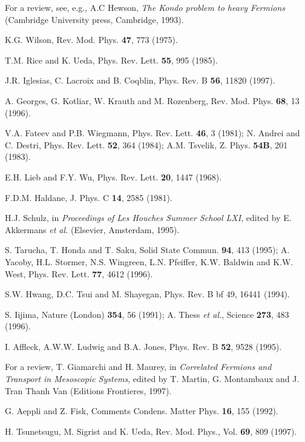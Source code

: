\begin{references}

For a review, see, e.g., A.C Hewson, {\it The Kondo problem to 
heavy Fermions} (Cambridge University press, Cambridge, 1993).

 K.G. Wilson, Rev. Mod. Phys. {\bf 47}, 773 (1975).

T.M. Rice and K. Ueda, Phys. Rev. Lett. {\bf 55}, 995 (1985).

J.R. Iglesias, C. Lacroix and B. Coqblin, Phys. Rev. B {\bf 56}, 11820 (1997).

A. Georges, G. Kotliar, W. Krauth and M. Rozenberg, Rev. Mod. Phys. {\bf 68},
13 (1996).

V.A. Fateev and P.B. Wiegmann, 
Phys. Rev. Lett. {\bf 46}, 3 (1981); N. Andrei and C. Destri, 
Phys. Rev. Lett. {\bf 52}, 364 (1984); A.M. Tsvelik, Z. Phys. {\bf 54B}, 201
(1983).
 
E.H. Lieb and F.Y. Wu, Phys. Rev. Lett. {\bf 20}, 1447 (1968).

F.D.M. Haldane, J. Phys. C {\bf 14}, 2585 (1981).

H.J. Schulz, in \emph{Proceedings of Les Houches Summer School
LXI}, edited by E. Akkermans \emph{et al.} (Elsevier, Amsterdam, 1995).

S. Tarucha, T. Honda and T. Saku, Solid State Commun. {\bf
94}, 413 (1995); A. Yacoby, H.L. Stormer, N.S. Wingreen, L.N. Pfeiffer,
K.W. Baldwin and K.W. West, Phys. Rev. Lett. {\bf 77}, 4612 (1996).

S.W. Hwang, D.C. Tsui and M. Shayegan, Phys. Rev. B {bf 49}, 16441 (1994).

S. Iijima, Nature (London) {\bf 354}, 56 (1991); A. Thess
{\it et al.}, Science {\bf 273}, 483 (1996).

 I. Affleck, A.W.W. Ludwig and B.A. Jones, Phys. Rev. B {\bf
52}, 9528 (1995).

For a review, 
T. Giamarchi and H. Maurey, in \emph{Correlated Fermions and Transport 
in Mesoscopic Systems}, edited 
by T. Martin, G. Montambaux and J. Tran Thanh Van
(Editions Frontieres, 1997).

G. Aeppli and Z. Fisk, Comments Condens. Matter Phys.
{\bf 16}, 155 (1992).

H. Tsunetsugu, M. Sigrist and K. Ueda, Rev. Mod. Phys., Vol. {\bf 69}, 809 
(1997).


\end{references}

